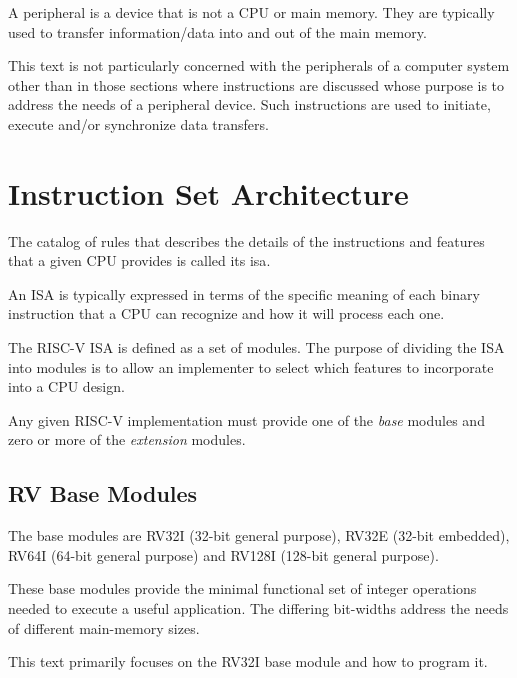 A peripheral is a device that is not a CPU or main memory.  They are 
typically used to transfer information/data into and out of the 
main memory.

This text is not particularly concerned with the peripherals of a computer
system other than in those sections where instructions are discussed 
whose purpose is to address the needs of a peripheral device.  Such
instructions are used to initiate, execute and/or synchronize data transfers.


\section{Instruction Set Architecture}

The catalog of rules that describes the details of the instructions 
and features that a given CPU provides is called its \acrfull{isa}.

An ISA is typically expressed in terms of the specific meaning of
each binary instruction that a CPU can recognize and how it will
process each one.

The RISC-V ISA is defined as a set of modules.  The purpose of
dividing the ISA into modules is to allow an implementer to select which 
features to incorporate into a CPU design.\cite[p.~4]{rvismv1v22:2017}

Any given RISC-V implementation must provide one of the {\em base}
modules and zero or more of the {\em extension} modules.\cite[p.~4]{rvismv1v22:2017}

\subsection{RV Base Modules}

The base modules are RV32I (32-bit general purpose), 
RV32E (32-bit embedded), RV64I (64-bit general purpose) 
and RV128I (128-bit general purpose).\cite[p.~4]{rvismv1v22:2017}

These base modules provide the minimal functional set of integer operations
needed to execute a useful application.  The differing bit-widths address
the needs of different main-memory sizes.

This text primarily focuses on the RV32I base module and how to program it.


